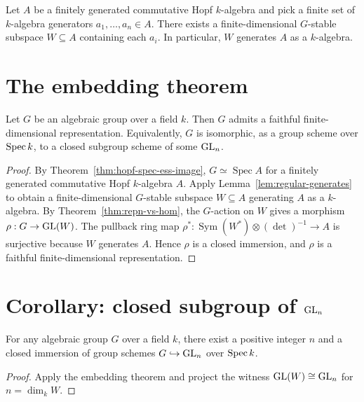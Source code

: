 \begin{lemma}
  \label{lem:regular-generates}
Let $A$ be a finitely generated commutative Hopf $k$-algebra and pick a
finite set of $k$-algebra generators $a_1, \ldots, a_n \in A$. There
exists a finite-dimensional $G$-stable subspace $W \subseteq A$
containing each $a_i$. In particular, $W$ generates $A$ as a
$k$-algebra.
\end{lemma}

\section{The embedding theorem}

\begin{theorem}\label{thm:embedding}
Let $G$ be an algebraic group over a field $k$. Then $G$ admits a
faithful finite-dimensional representation. Equivalently, $G$ is
isomorphic, as a group scheme over $\operatorname{Spec} k$, to a closed subgroup
scheme of some $\mathrm{GL}_n$.
\end{theorem}
\begin{proof}
By Theorem~\ref{thm:hopf-spec-ess-image}, $G \simeq \operatorname{Spec} A$
for a finitely generated commutative Hopf $k$-algebra $A$. Apply
Lemma~\ref{lem:regular-generates} to obtain a finite-dimensional
$G$-stable subspace $W \subseteq A$ generating $A$ as a $k$-algebra. By
Theorem~\ref{thm:repn-vs-hom}, the $G$-action on $W$ gives a morphism
$\rho : G \to \mathrm{GL}(W)$. The pullback ring map
$\rho^* : \operatorname{Sym}(W^*) \otimes (\det)^{-1} \to A$ is
surjective because $W$ generates $A$. Hence $\rho$ is a closed immersion,
and $\rho$ is a faithful finite-dimensional representation.
\end{proof}

\section{Corollary: closed subgroup of \texorpdfstring{$\mathrm{GL}_n$}{GL\_n}}

\begin{corollary}\label{cor:closed-subgroup-of-GL}
For any algebraic group $G$ over a field $k$, there exist a positive
integer $n$ and a closed immersion of group schemes
$G \hookrightarrow \mathrm{GL}_n$ over $\operatorname{Spec} k$.
\end{corollary}
\begin{proof}
Apply the embedding theorem and project the witness
$\mathrm{GL}(W) \cong \mathrm{GL}_n$ for $n = \dim_k W$.
\end{proof}
